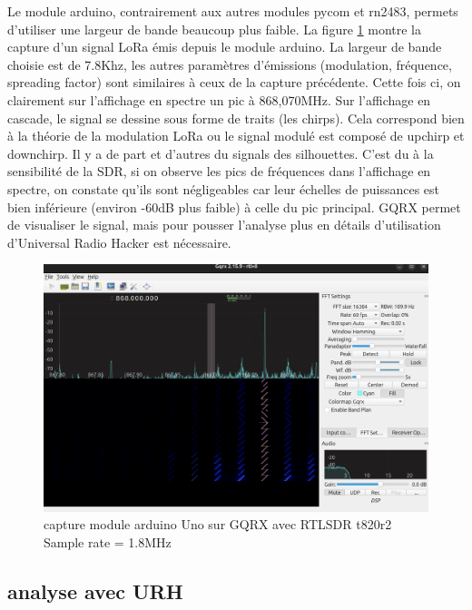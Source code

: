 Le module arduino, contrairement aux autres modules pycom et rn2483, permets d'utiliser une largeur de bande beaucoup plus faible. La figure \ref{term302} montre la capture d'un signal LoRa émis depuis le module arduino. La largeur de bande choisie est de 7.8Khz, les autres paramètres d'émissions (modulation, fréquence, spreading factor) sont similaires à ceux de la capture précédente. Cette fois ci, on clairement sur l'affichage en spectre un pic à 868,070MHz. Sur l'affichage en cascade, le signal se dessine sous forme de traits (les chirps). Cela correspond bien à la théorie de la modulation LoRa ou le signal modulé est composé de upchirp et downchirp. Il y a de part et d'autres du signals des silhouettes. C'est du à la sensibilité de la SDR, si on observe les pics de fréquences dans l'affichage en spectre, on constate qu'ils sont négligeables car leur échelles de puissances est bien inférieure (environ -60dB plus faible) à celle du pic principal. GQRX permet de visualiser le signal, mais pour pousser l'analyse plus en détails d'utilisation d'Universal Radio Hacker est nécessaire.

\begin{figure}[h]
\centering

\includegraphics[scale=0.18]{images/gqrx5.png}
\caption{capture module arduino Uno sur GQRX avec RTLSDR t820r2 Sample rate = 1.8MHz}\label{term302}
\end{figure}

\newpage

\subsection{analyse avec URH}\label{urh}

